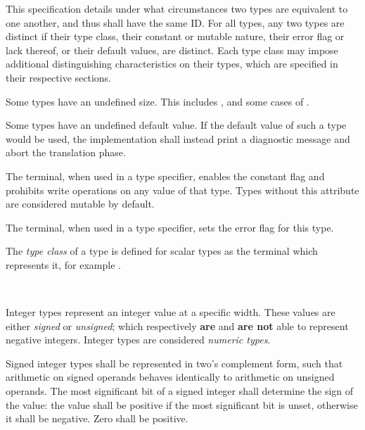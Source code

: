 This specification details under what circumstances two types are equivalent to
one another, and thus shall have the same ID. For all types, any two types are
distinct if their type class, their constant or mutable nature, their error
flag or lack thereof, or their default values, are distinct. Each type class
may impose additional distinguishing characteristics on their types, which are
specified in their respective sections.

\specsubitem
Some types have an undefined size. This includes ,
and some cases of .

\specsubitem
Some types have an undefined default value. If the default value of such a type
would be used, the implementation shall instead print a diagnostic message and
abort the translation phase.

\specsubitem
The  terminal, when used in a type specifier, enables the
constant flag and prohibits write operations on any value of that type. Types
without this attribute are considered mutable by default.

\specsubitem
The \terminal{!} terminal, when used in a type specifier, sets the
error flag for this type.

\specsubitem
The \textit{type class} of a type is defined for scalar types as the terminal
which represents it, for example .


\begin{grammar}
\oneof \\
\end{grammar}

\specsubsubitem
Integer types represent an integer value at a specific width. These values are
either \textit{signed} or \textit{unsigned}; which respectively \textbf{are} and
\textbf{are not} able to represent negative integers. Integer types are
considered \textit{numeric types}.

\specsubsubitem
Signed integer types shall be represented in two's complement form, such that
arithmetic on signed operands behaves identically to arithmetic on unsigned
operands. The most significant bit of a signed integer shall determine the sign
of the value: the value shall be positive if the most significant bit is unset,
otherwise it shall be negative. Zero shall be positive.

